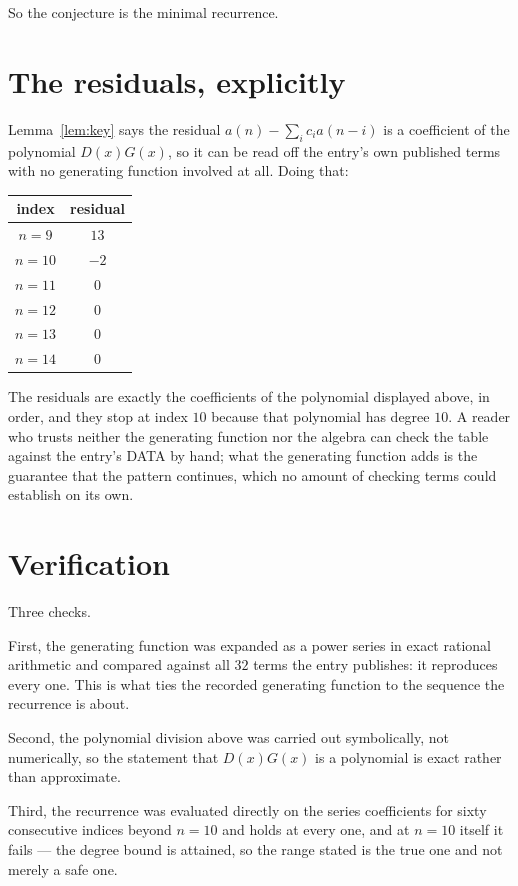 \documentclass[11pt,a4paper]{article}
\theoremstyle{plain}
\theoremstyle{definition}
\begin{document}
So the conjecture is the minimal recurrence.

\section{The residuals, explicitly}

Lemma~\ref{lem:key} says the residual $a(n)-\sum_ic_ia(n-i)$ is a coefficient of the
polynomial $D(x)G(x)$, so it can be read off the entry's own published terms with no
generating function involved at all. Doing that:
\begin{center}
\begin{tabular}{cc}
index & residual \\ \hline
$n=9$ & $13$ \\
$n=10$ & $-2$ \\
$n=11$ & $0$ \\
$n=12$ & $0$ \\
$n=13$ & $0$ \\
$n=14$ & $0$
\end{tabular}
\end{center}
The residuals are exactly the coefficients of the polynomial displayed above, in order, and
they stop at index $10$ because that polynomial has degree $10$. A reader who trusts
neither the generating function nor the algebra can check the table against the entry's DATA
by hand; what the generating function adds is the guarantee that the pattern continues, which
no amount of checking terms could establish on its own.

\section{Verification}

Three checks.

First, the generating function was expanded as a power series in exact rational arithmetic and
compared against all $32$ terms the entry publishes: it reproduces every one. This is
what ties the recorded generating function to the sequence the recurrence is about.

Second, the polynomial division above was carried out symbolically, not numerically, so the
statement that $D(x)G(x)$ is a polynomial is exact rather than approximate.

Third, the recurrence was evaluated directly on the series coefficients for sixty consecutive
indices beyond $n=10$ and holds at every one, and at $n=10$ itself it fails --- the
degree bound is attained, so the range stated is the true one and not merely a safe one.
\end{document}
